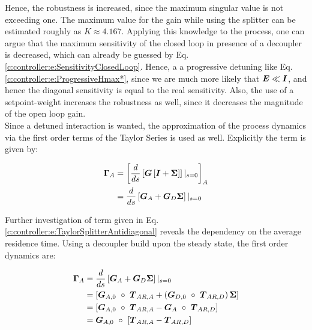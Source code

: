 Hence, the robustness is increased, since the maximum singular value is not exceeding one. The maximum value for the gain while using the splitter can be estimated roughly as $K \approx 4.167$. Applying this knowledge to the process, one can argue that the maximum sensitivity of the closed loop in presence of a decoupler is decreased, which can already be guessed by Eq. \ref{c:controller:e:SensitivityClosedLoop}. Hence, a a progressive detuning like Eq.\ref{c:controller:e:ProgressiveHmax*}, since we are much more likely that $\mbox{\boldmath$E$} \ll \mbox{\boldmath$I$}$, and hence the diagonal sensitivity is equal to the real sensitivity. Also, the use of a setpoint-weight increases the robustness as well, since it decreases the magnitude of the open loop gain.\\ 

Since a detuned interaction is wanted, the approximation of the process dynamics via the first order terms of the Taylor Series is used as well. Explicitly the term is given by:

\begin{align}
\begin{split}
\mbox{\boldmath$\Gamma$}_A &= \left[\frac{d}{ds}\left[ \mbox{\boldmath$G$} \left[ \mbox{\boldmath$I$} + \mbox{\boldmath$\Sigma$} \right] \right]|_{s=0}\right]_A\\
&= \frac{d}{ds}\left[ \mbox{\boldmath$G$}_A + \mbox{\boldmath$G$}_D \mbox{\boldmath$\Sigma$} \right]|_{s=0}
\end{split}
\label{c:controller:e:TaylorSplitterAntidiagonal}
\end{align}

Further investigation of term given in Eq. \ref{c:controller:e:TaylorSplitterAntidiagonal} reveals the dependency on the average residence time. Using a decoupler build upon the steady state, the first order dynamics are:

\begin{align}
\begin{split}
\mbox{\boldmath$\Gamma$}_A &= \frac{d}{ds}\left[ \mbox{\boldmath$G$}_A + \mbox{\boldmath$G$}_D \mbox{\boldmath$\Sigma$} \right]|_{s=0} \\
&= \left[ \mbox{\boldmath$G$}_{A,0}~\circ~\mbox{\boldmath$T$}_{AR,A} + \left(\mbox{\boldmath$G$}_{D,0}~\circ~\mbox{\boldmath$T$}_{AR,D} \right) \mbox{\boldmath$\Sigma$} \right] \\
&= \left[ \mbox{\boldmath$G$}_{A,0}~\circ~\mbox{\boldmath$T$}_{AR,A} - \mbox{\boldmath$G$}_A~\circ~\mbox{\boldmath$T$}_{AR,D}  \right] \\
&= \mbox{\boldmath$G$}_{A,0}~\circ~\left[ \mbox{\boldmath$T$}_{AR,A} - \mbox{\boldmath$T$}_{AR,D}\right]
\end{split}
\label{c:controller:e:TaylorSplitterDynamics}
\end{align}

